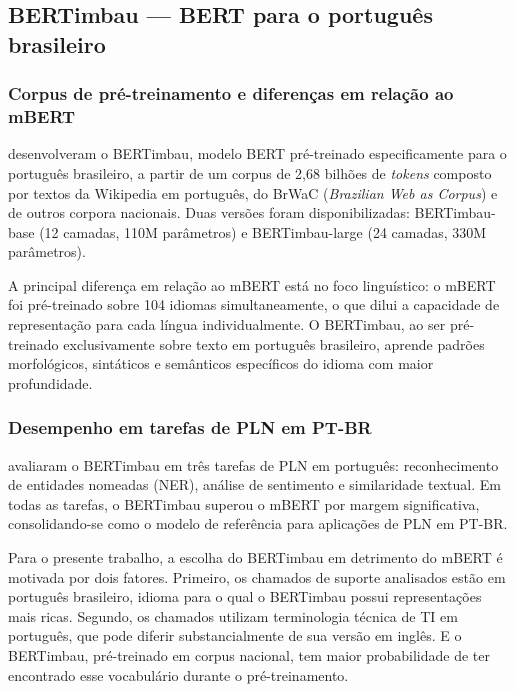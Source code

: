 \documentclass[
    12pt,                %
    openright,           %
    oneside,             %
    a4paper,             %
    english,             %
    brazil               %
]{abntex2}
\begin{document}
\subsection{BERTimbau — BERT para o português brasileiro}
\label{subsec:bertimbau}

\subsubsection{Corpus de pré-treinamento e diferenças em relação ao mBERT}
\label{subsubsec:bertimbau_corpus}

 desenvolveram o BERTimbau, modelo BERT pré-treinado especificamente para o português brasileiro, a partir de um corpus de 2,68 bilhões de \textit{tokens} composto por textos da Wikipedia em português, do BrWaC (\textit{Brazilian Web as Corpus}) e de outros corpora nacionais. Duas versões foram disponibilizadas: BERTimbau-base (12 camadas, 110M parâmetros) e BERTimbau-large (24 camadas, 330M parâmetros).

A principal diferença em relação ao mBERT está no foco linguístico: o mBERT foi pré-treinado sobre 104 idiomas simultaneamente, o que dilui a capacidade de representação para cada língua individualmente. O BERTimbau, ao ser pré-treinado exclusivamente sobre texto em português brasileiro, aprende padrões morfológicos, sintáticos e semânticos específicos do idioma com maior profundidade.

\subsubsection{Desempenho em tarefas de PLN em PT-BR}
\label{subsubsec:bertimbau_desempenho}

 avaliaram o BERTimbau em três tarefas de PLN em português: reconhecimento de entidades nomeadas (NER), análise de sentimento e similaridade textual. Em todas as tarefas, o BERTimbau superou o mBERT por margem significativa, consolidando-se como o modelo de referência para aplicações de PLN em PT-BR.

Para o presente trabalho, a escolha do BERTimbau em detrimento do mBERT é motivada por dois fatores. Primeiro, os chamados de suporte analisados estão em português brasileiro, idioma para o qual o BERTimbau possui representações mais ricas. Segundo, os chamados utilizam terminologia técnica de TI em português, que pode diferir substancialmente de sua versão em inglês. E o BERTimbau, pré-treinado em corpus nacional, tem maior probabilidade de ter encontrado esse vocabulário durante o pré-treinamento.
\end{document}

